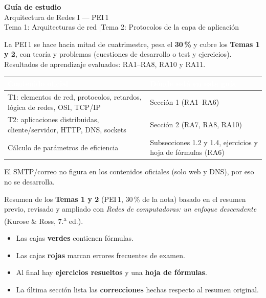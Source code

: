 \documentclass[11pt,a4paper]{article}
\newcommand{\hd}[1]{\cellcolor{uahblue}\textcolor{white}{\textbf{#1}}}
\begin{document}
\begin{tcolorbox}[colback=uahblue,colframe=uahblue,arc=0pt,top=14pt,bottom=14pt,left=14pt,right=14pt]
{\sffamily\Huge\bfseries\color{white}Guía de estudio}\\[4pt]
{\sffamily\Large\color{white}Arquitectura de Redes I --- PEI\,1}\\[4pt]
{\sffamily\color{white!85!uahblue}Tema 1: Arquitecturas de red \quad|\quad Tema 2: Protocolos de la capa de aplicación}
\end{tcolorbox}

\begin{definicion}
La PEI\,1 se hace hacia mitad de cuatrimestre, pesa el \textbf{30\,\%} y cubre los \textbf{Temas 1 y 2}, con teoría y problemas (cuestiones de desarrollo o test y ejercicios). Resultados de aprendizaje evaluados: RA1--RA8, RA10 y RA11.
\vspace{2pt}
\begin{tabularx}{\linewidth}{@{}L{6.4cm}X@{}}
\toprule
\hd{Contenido oficial} & \hd{Dónde está en esta guía} \\
\midrule
T1: elementos de red, protocolos, retardos, lógica de redes, OSI, TCP/IP & Sección 1 (RA1--RA6) \\
T2: aplicaciones distribuidas, cliente/servidor, HTTP, DNS, sockets & Sección 2 (RA7, RA8, RA10) \\
Cálculo de parámetros de eficiencia & Subsecciones 1.2 y 1.4, ejercicios y hoja de fórmulas (RA6) \\
\bottomrule
\end{tabularx}

El SMTP/correo no figura en los contenidos oficiales (solo web y DNS), por eso no se desarrolla.
\end{definicion}

\begin{definicion}
Resumen de los \textbf{Temas 1 y 2} (PEI\,1, 30\,\% de la nota) basado en el resumen previo, revisado y ampliado con \emph{Redes de computadoras: un enfoque descendente} (Kurose \& Ross, 7.\textsuperscript{a} ed.).
\begin{itemize}[leftmargin=1.2em]
  \item Las cajas \textbf{verdes} contienen fórmulas.
  \item Las cajas \textbf{rojas} marcan errores frecuentes de examen.
  \item Al final hay \textbf{ejercicios resueltos} y una \textbf{hoja de fórmulas}.
  \item La última sección lista las \textbf{correcciones} hechas respecto al resumen original.
\end{itemize}
\end{definicion}
\end{document}
